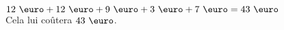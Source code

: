 \exo{}

 $12~\text{\euro}+12~\text{\euro}+9~\text{\euro}+3~\text{\euro}+7~\text{\euro}=43~\text{\euro}$\\
 Cela lui coûtera $43~\text{\euro}$. 
